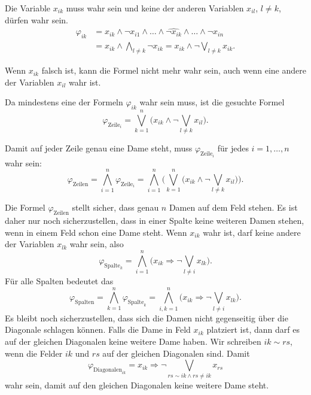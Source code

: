 \begin{loesung}
\begin{teilaufgaben}
\item
Die Variable $x_{ik}$ muss wahr sein und keine der anderen Variablen
$x_{il}$, $l\ne k$, dürfen wahr sein.
\begin{align*}
\varphi_{ik}
&=
x_{ik}\wedge \neg x_{i1} \wedge
\ldots
\wedge \widehat{\neg x_{ik}}\wedge
\ldots
\wedge \neg x_{in}
\\
&=
x_{ik} \wedge \bigwedge_{l\ne k} \neg x_{ik}
=
x_{ik} \wedge \neg \bigvee_{l\ne k} x_{ik}.
\end{align*}
\item
Wenn $x_{ik}$ falsch ist, kann die Formel nicht mehr wahr sein, auch wenn 
eine andere der Variablen $x_{il}$ wahr ist.
\item
Da mindestens eine der Formeln $\varphi_{ik}$ wahr sein muss, ist
die gesuchte Formel
\begin{equation}
\varphi_{\text{Zeile}_i}
=
\bigvee_{k=1}^n
\biggl(
x_{ik} \wedge \neg \bigvee_{l\ne k} x_{il}
\biggr).
\label{70000072:zeile}
\end{equation}
\item
Damit auf jeder Zeile genau eine Dame steht, muss $\varphi_{\text{Zeile}_i}$
für jedes $i=1,\dots,n$ wahr sein:
\[
\varphi_{\text{Zeilen}}
=
\bigwedge_{i=1}^n
\varphi_{\text{Zeile}_i}
=
\bigwedge_{i=1}^n
\biggl(
\bigvee_{k=1}^n
\biggl(
x_{ik} \wedge \neg \bigvee_{l\ne k} x_{il}
\biggr)
\biggr).
\]
\item
Die Formel $\varphi_{\text{Zeilen}}$ stellt sicher, dass genau
$n$ Damen auf dem Feld stehen.
Es ist daher nur noch sicherzustellen, dass in einer Spalte
keine weiteren Damen stehen, wenn in einem Feld schon eine
Dame steht.
Wenn $x_{ik}$ wahr ist, darf keine andere der Variablen $x_{lk}$
wahr sein, also
\[
\varphi_{\text{Spalte}_k}
=
\bigwedge_{i=1}^n
\biggl(
x_{ik}\Rightarrow \neg \bigvee_{l\ne i}x_{lk}
\biggr).
\]
Für alle Spalten bedeutet das
\[
\varphi_{\text{Spalten}}
=
\bigwedge_{k=1}^n
\varphi_{\text{Spalte}_k}
=
\bigwedge_{i,k=1}^n
\biggl(
x_{ik}\Rightarrow \neg \bigvee_{l\ne i}x_{lk}
\biggr).
\]
Es bleibt noch sicherzustellen, dass sich die Damen nicht gegenseitig
über die Diagonale schlagen können.
Falls die Dame in Feld $x_{ik}$ platziert ist, dann darf es auf der
gleichen Diagonalen keine weitere Dame haben.
Wir schreiben $ik\sim rs$, wenn die Felder $ik$ und $rs$ auf der 
gleichen Diagonalen sind.
Damit 
\[
\varphi_{\text{Diagonalen}_{ik}}
=
x_{ik}\Rightarrow \neg\bigvee_{rs\sim ik\wedge rs\ne ik}  x_{rs}
\]
wahr sein, damit auf den gleichen Diagonalen keine weitere Dame steht.


\end{teilaufgaben}
\end{loesung}
